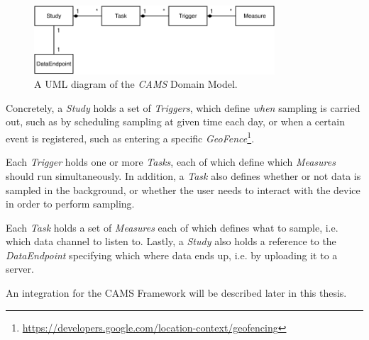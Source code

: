 \begin{figure}[h]
    \centering
    \includegraphics[width=0.8\textwidth]{images/CAMS-UML.pdf}
    \caption{A UML diagram of the \textit{CAMS} Domain Model.}
    \label{fig:cams_uml}
\end{figure}

Concretely, a \textit{Study} holds a set of \textit{Triggers}, which define \textit{when} sampling is carried out, such as by scheduling sampling at  given time each day, or when a certain event is registered, such as entering a specific \textit{GeoFence}\footnote{\url{https://developers.google.com/location-context/geofencing}}. 

Each \textit{Trigger} holds one or more \textit{Tasks}, each of which define which \textit{Measures} should run simultaneously. In addition, a \textit{Task} also defines whether or not data is sampled in the background, or whether the user needs to interact with the device in order to perform sampling. 

Each \textit{Task} holds a set of \textit{Measures} each of which defines what to sample, i.e. which data channel to listen to. Lastly, a \textit{Study} also holds a reference to the \textit{DataEndpoint} specifying which where data ends up, i.e. by uploading it to a server.

An integration for the CAMS Framework will be described later in this thesis. 